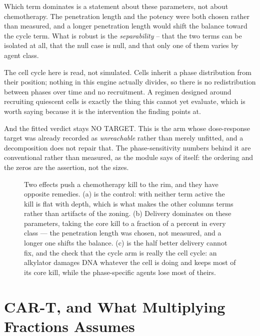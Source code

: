 \documentclass[11pt,twoside,openright]{report}
\begin{document}
\begin{refusal}
Which term dominates is a statement about these parameters, not about chemotherapy. The penetration length and the potency were both chosen rather than measured, and a longer penetration length would shift the balance toward the cycle term. What is robust is the \textit{separability} -- that the two terms can be isolated at all, that the null case is null, and that only one of them varies by agent class.

The cell cycle here is read, not simulated. Cells inherit a phase distribution from their position; nothing in this engine actually divides, so there is no redistribution between phases over time and no recruitment. A regimen designed around recruiting quiescent cells is exactly the thing this cannot yet evaluate, which is worth saying because it is the intervention the finding points at.

And the fitted verdict stays NO TARGET. This is the arm whose dose-response target was already recorded as \textit{unreachable} rather than merely unfitted, and a decomposition does not repair that. The phase-sensitivity numbers behind it are conventional rather than measured, as the module says of itself: the ordering and the zeros are the assertion, not the sizes.
\end{refusal}

\begin{figure}[tbp]
\setcounter{figure}{43}
\caption{Two effects push a chemotherapy kill to the rim, and they have opposite remedies. (a) is the control: with neither term active the kill is flat with depth, which is what makes the other columns terms rather than artifacts of the zoning. (b) Delivery dominates on these parameters, taking the core kill to a fraction of a percent in every class --- the penetration length was chosen, not measured, and a longer one shifts the balance. (c) is the half better delivery cannot fix, and the check that the cycle arm is really the cell cycle: an alkylator damages DNA whatever the cell is doing and keeps most of its core kill, while the phase-specific agents lose most of theirs.}
\label{fig:fig48_chemo_decomposition}
\end{figure}

\section{CAR-T, and What Multiplying Fractions Assumes}
\end{document}
